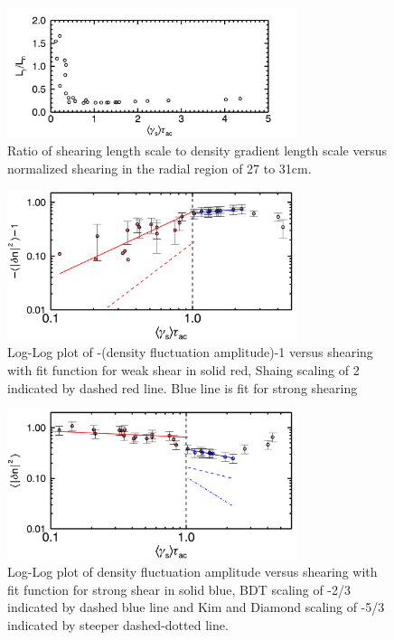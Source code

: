 \documentclass[aip,pop,amsmath,amssymb,preprint,superscriptaddress]{revtex4-1} %
\begin{document}
\begin{figure}[!htbp]
\centerline{
\includegraphics[width=8.5cm]{LgammaLn}}
\caption{\label{fig:LgammaLn} Ratio of shearing length scale to density gradient length scale versus normalized shearing in the radial region of 27 to 31cm.}
\end{figure}

\begin{figure}[!htbp]
\centerline{
\includegraphics[width=8.5cm]{densloglog_weak}}
\caption{\label{fig:densloglog_weak} Log-Log plot of -(density fluctuation amplitude)-1 versus shearing with fit function for weak shear in solid red, Shaing scaling of 2 indicated by dashed red line. Blue line is fit for strong shearing}
\end{figure}

\begin{figure}[!htbp]
\centerline{
\includegraphics[width=8.5cm]{densloglog_strong}}
\caption{\label{fig:densloglog_strong} Log-Log plot of density fluctuation amplitude versus shearing with fit function for strong shear in solid blue, BDT scaling of -2/3 indicated by dashed blue line and Kim and Diamond scaling of -5/3 indicated by steeper dashed-dotted line.}
\end{figure}
\end{document}
